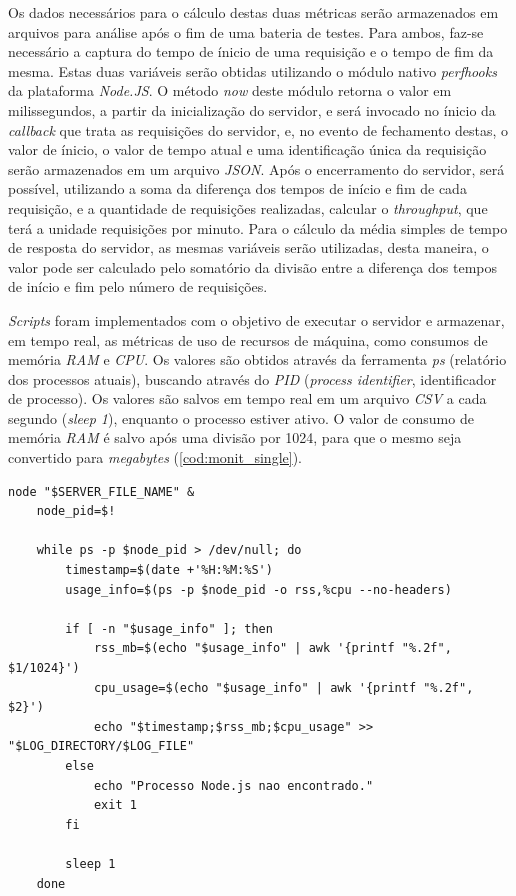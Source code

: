 \documentclass[12pt]{article}
\begin{document}
Os dados necessários para o cálculo destas duas métricas serão armazenados em arquivos para análise após o fim de uma 
bateria de testes. Para ambos, faz-se necessário a captura do tempo de ínicio de uma requisição
e o tempo de fim da mesma. Estas duas variáveis serão obtidas utilizando
o módulo nativo \textit{perf\textunderscore hooks} da plataforma \textit{Node.JS}. 
O método \textit{now} deste módulo retorna o valor em milissegundos, a partir da inicialização
do servidor, e será invocado no ínicio da 
\textit{callback} que trata as requisições do servidor, e, no evento de 
fechamento destas, o valor de ínicio, o valor de tempo atual e
uma identificação única da requisição serão armazenados em um arquivo \textit{JSON}. Após o encerramento do servidor, será 
possível, utilizando a soma da diferença dos tempos de início e fim de cada requisição, e a quantidade de requisições realizadas, calcular o 
\textit{throughput}, que terá a unidade requisições por minuto. Para o cálculo da média simples de tempo de resposta do servidor, 
as mesmas variáveis serão utilizadas, desta maneira, o valor pode ser calculado pelo somatório da 
divisão entre a diferença dos tempos de início e fim pelo número de requisições.

\textit{Scripts} foram implementados com o objetivo de executar o servidor e armazenar, em tempo real,
as métricas de uso de recursos de máquina, como consumos de memória \textit{RAM} e \textit{CPU}. Os valores 
são obtidos através da ferramenta \textit{ps} (relatório dos processos atuais), buscando através do 
\textit{PID} (\textit{process identifier}, identificador de processo). Os valores são salvos em tempo real em um arquivo 
\textit{CSV} a cada segundo (\textit{sleep 1}), enquanto o processo estiver ativo. 
O valor de consumo de memória \textit{RAM} é salvo após uma divisão por 1024, para que o mesmo 
seja convertido para \textit{megabytes} (\autoref{cod:monit_single}). 

\begin{lstlisting}[caption={\textit{Script} para monitrar processos \textit{single thread}}, label=cod:monit_single]
	node "$SERVER_FILE_NAME" &
	node_pid=$!

	while ps -p $node_pid > /dev/null; do
		timestamp=$(date +'%H:%M:%S')
		usage_info=$(ps -p $node_pid -o rss,%cpu --no-headers)

		if [ -n "$usage_info" ]; then
			rss_mb=$(echo "$usage_info" | awk '{printf "%.2f", $1/1024}')
			cpu_usage=$(echo "$usage_info" | awk '{printf "%.2f", $2}')
			echo "$timestamp;$rss_mb;$cpu_usage" >> "$LOG_DIRECTORY/$LOG_FILE"
		else
			echo "Processo Node.js nao encontrado."
			exit 1
		fi

		sleep 1
	done
\end{lstlisting}
\end{document}
